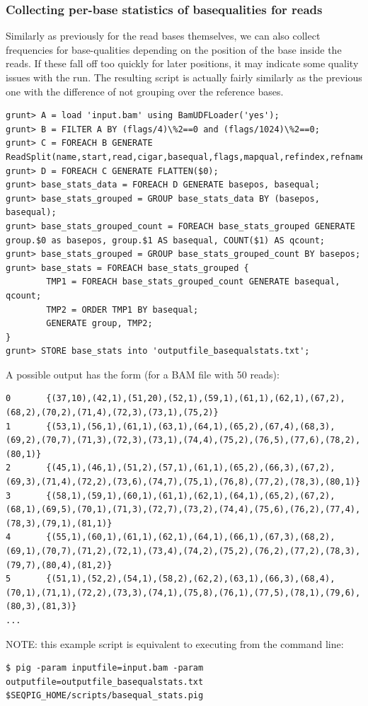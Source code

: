 \subsubsection{Collecting per-base statistics of basequalities for reads}
Similarly as previously for the read bases themselves, we can also collect
frequencies for base-qualities depending on the position of the base inside
the reads. If these fall off too quickly for later positions, it may
indicate some quality issues with the run. The resulting script is actually
fairly similarly as the previous one with the difference of not grouping
over the reference bases.
\begin{lstlisting}
grunt> A = load 'input.bam' using BamUDFLoader('yes');
grunt> B = FILTER A BY (flags/4)\%2==0 and (flags/1024)\%2==0;
grunt> C = FOREACH B GENERATE ReadSplit(name,start,read,cigar,basequal,flags,mapqual,refindex,refname,attributes#'MD');
grunt> D = FOREACH C GENERATE FLATTEN($0);
grunt> base_stats_data = FOREACH D GENERATE basepos, basequal;
grunt> base_stats_grouped = GROUP base_stats_data BY (basepos, basequal);
grunt> base_stats_grouped_count = FOREACH base_stats_grouped GENERATE group.$0 as basepos, group.$1 AS basequal, COUNT($1) AS qcount;
grunt> base_stats_grouped = GROUP base_stats_grouped_count BY basepos;
grunt> base_stats = FOREACH base_stats_grouped {
        TMP1 = FOREACH base_stats_grouped_count GENERATE basequal, qcount;
        TMP2 = ORDER TMP1 BY basequal;
        GENERATE group, TMP2;
}
grunt> STORE base_stats into 'outputfile_basequalstats.txt';
\end{lstlisting}
A possible output has the form (for a BAM file with 50 reads):
\begin{lstlisting}
0       {(37,10),(42,1),(51,20),(52,1),(59,1),(61,1),(62,1),(67,2),(68,2),(70,2),(71,4),(72,3),(73,1),(75,2)}
1       {(53,1),(56,1),(61,1),(63,1),(64,1),(65,2),(67,4),(68,3),(69,2),(70,7),(71,3),(72,3),(73,1),(74,4),(75,2),(76,5),(77,6),(78,2),(80,1)}
2       {(45,1),(46,1),(51,2),(57,1),(61,1),(65,2),(66,3),(67,2),(69,3),(71,4),(72,2),(73,6),(74,7),(75,1),(76,8),(77,2),(78,3),(80,1)}
3       {(58,1),(59,1),(60,1),(61,1),(62,1),(64,1),(65,2),(67,2),(68,1),(69,5),(70,1),(71,3),(72,7),(73,2),(74,4),(75,6),(76,2),(77,4),(78,3),(79,1),(81,1)}
4       {(55,1),(60,1),(61,1),(62,1),(64,1),(66,1),(67,3),(68,2),(69,1),(70,7),(71,2),(72,1),(73,4),(74,2),(75,2),(76,2),(77,2),(78,3),(79,7),(80,4),(81,2)}
5       {(51,1),(52,2),(54,1),(58,2),(62,2),(63,1),(66,3),(68,4),(70,1),(71,1),(72,2),(73,3),(74,1),(75,8),(76,1),(77,5),(78,1),(79,6),(80,3),(81,3)}
...
\end{lstlisting}
NOTE: this example script is equivalent to executing from the command line:
\begin{lstlisting}
$ pig -param inputfile=input.bam -param outputfile=outputfile_basequalstats.txt $SEQPIG_HOME/scripts/basequal_stats.pig
\end{lstlisting}


